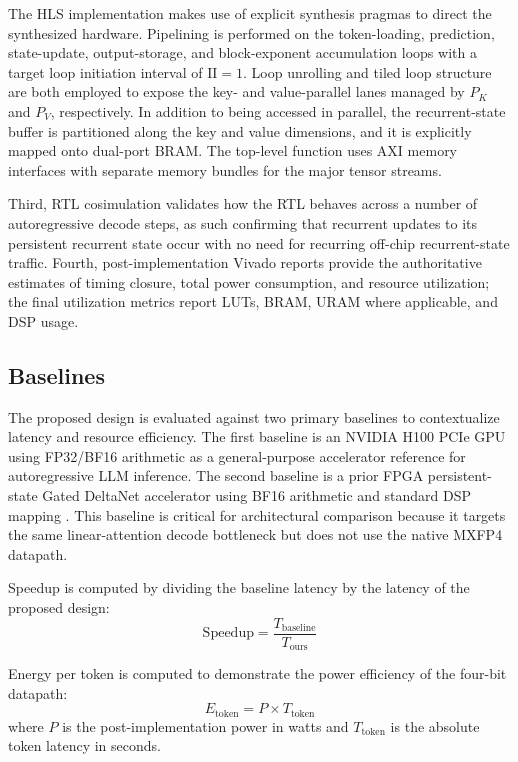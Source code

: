 ﻿\documentclass[conference]{IEEEtran}
\begin{document}
The HLS implementation makes use of explicit synthesis pragmas to direct the synthesized hardware. Pipelining is performed on the token-loading, prediction, state-update, output-storage, and block-exponent accumulation loops with a target loop initiation interval of $\mathrm{II} = 1$. Loop unrolling and tiled loop structure are both employed to expose the key- and value-parallel lanes managed by $P_K$ and $P_V$, respectively. In addition to being accessed in parallel, the recurrent-state buffer is partitioned along the key and value dimensions, and it is explicitly mapped onto dual-port BRAM. The top-level function uses AXI memory interfaces with separate memory bundles for the major tensor streams.

Third, RTL cosimulation validates how the RTL behaves across a number of autoregressive decode steps, as such confirming that recurrent updates to its persistent recurrent state occur with no need for recurring off-chip recurrent-state traffic. Fourth, post-implementation Vivado reports provide the authoritative estimates of timing closure, total power consumption, and resource utilization; the final utilization metrics report LUTs, BRAM, URAM where applicable, and DSP usage.

\subsection{Baselines}
The proposed design is evaluated against two primary baselines to contextualize latency and resource efficiency. The first baseline is an NVIDIA H100 PCIe GPU using FP32/BF16 arithmetic as a general-purpose accelerator reference for autoregressive LLM inference. The second baseline is a prior FPGA persistent-state Gated DeltaNet accelerator using BF16 arithmetic and standard DSP mapping \cite{b10}. This baseline is critical for architectural comparison because it targets the same linear-attention decode bottleneck but does not use the native MXFP4 datapath.

Speedup is computed by dividing the baseline latency by the latency of the proposed design:
\begin{equation}
\text{Speedup} = \frac{T_{\text{baseline}}}{T_{\text{ours}}}
\end{equation}

Energy per token is computed to demonstrate the power efficiency of the four-bit datapath:
\begin{equation}
E_{\text{token}} = P \times T_{\text{token}}
\end{equation}
where $P$ is the post-implementation power in watts and $T_{\text{token}}$ is the absolute token latency in seconds.
\end{document}
